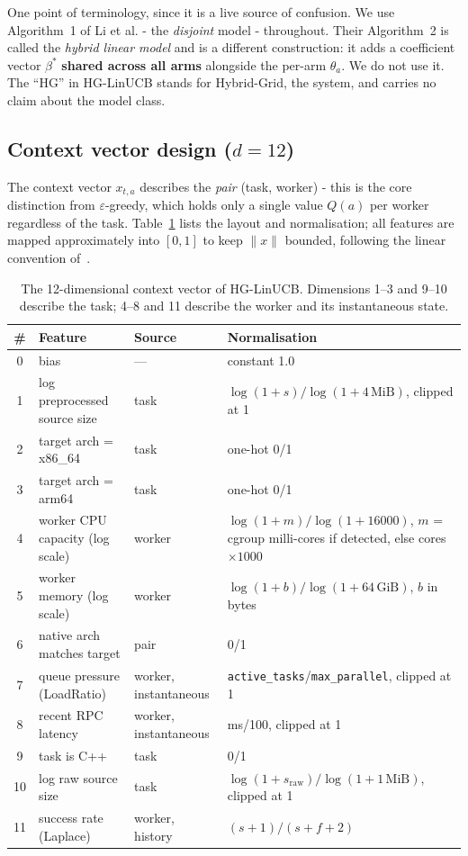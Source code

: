 \documentclass[final,5p,times,twocolumn]{elsarticle}
\begin{document}
One point of terminology, since it is a live source of confusion. We use Algorithm~1 of Li et al. - the \emph{disjoint} model - throughout. Their Algorithm~2 is called the \emph{hybrid linear model} and is a different construction: it adds a coefficient vector $\beta^*$ \textbf{shared across all arms} alongside the per-arm $\theta_a$. We do not use it. The ``HG'' in HG-LinUCB stands for Hybrid-Grid, the system, and carries no claim about the model class.

\subsection{Context vector design ($d=12$)}
\label{sec:context}

The context vector $x_{t,a}$ describes the \emph{pair} (task, worker) - this is the core distinction from $\varepsilon$-greedy, which holds only a single value $Q(a)$ per worker regardless of the task. Table~\ref{tab:features} lists the layout and normalisation; all features are mapped approximately into $[0,1]$ to keep $\|x\|$ bounded, following the linear convention of~\cite{chu2011}.

\begin{table}[t]
\centering
\caption{The 12-dimensional context vector of HG-LinUCB. Dimensions 1--3 and 9--10 describe the task; 4--8 and 11 describe the worker and its instantaneous state.}
\label{tab:features}
\small
\begin{tabular}{cllp{7.6cm}}
\toprule
\# & Feature & Source & Normalisation \\
\midrule
0  & bias & --- & constant 1.0 \\
1  & log preprocessed source size & task & $\log(1+s)/\log(1+4\,\text{MiB})$, clipped at 1 \\
2  & target arch = x86\_64 & task & one-hot 0/1 \\
3  & target arch = arm64 & task & one-hot 0/1 \\
4  & worker CPU capacity (log scale) & worker & $\log(1+m)/\log(1+16000)$, $m$ = cgroup milli-cores if detected, else cores$\times1000$ \\
5  & worker memory (log scale) & worker & $\log(1+b)/\log(1+64\,\text{GiB})$, $b$ in bytes \\
6  & native arch matches target & pair & 0/1 \\
7  & queue pressure (LoadRatio) & worker, instantaneous & \texttt{active\_tasks}/\texttt{max\_parallel}, clipped at 1 \\
8  & recent RPC latency & worker, instantaneous & ms/100, clipped at 1 \\
9  & task is C++ & task & 0/1 \\
10 & log raw source size & task & $\log(1+s_{\text{raw}})/\log(1+1\,\text{MiB})$, clipped at 1 \\
11 & success rate (Laplace) & worker, history & $(s+1)/(s+f+2)$ \\
\bottomrule
\end{tabular}
\end{table}
\end{document}
